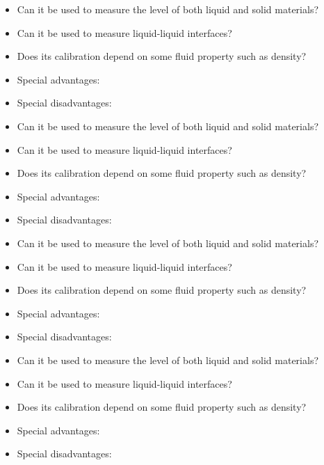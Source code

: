 \vskip 10pt

\begin{itemize}
\item{} Can it be used to measure the level of both liquid and solid materials?
\item{} Can it be used to measure liquid-liquid interfaces?
\item{} Does its calibration depend on some fluid property such as density?
\item{} Special advantages:
\item{} Special disadvantages:
\end{itemize}

\vskip 10pt

\begin{itemize}
\item{} Can it be used to measure the level of both liquid and solid materials?
\item{} Can it be used to measure liquid-liquid interfaces?
\item{} Does its calibration depend on some fluid property such as density?
\item{} Special advantages:
\item{} Special disadvantages:
\end{itemize}

\vskip 10pt

\begin{itemize}
\item{} Can it be used to measure the level of both liquid and solid materials?
\item{} Can it be used to measure liquid-liquid interfaces?
\item{} Does its calibration depend on some fluid property such as density?
\item{} Special advantages:
\item{} Special disadvantages:
\end{itemize}

\vskip 10pt

\begin{itemize}
\item{} Can it be used to measure the level of both liquid and solid materials?
\item{} Can it be used to measure liquid-liquid interfaces?
\item{} Does its calibration depend on some fluid property such as density?
\item{} Special advantages:
\item{} Special disadvantages:
\end{itemize}

